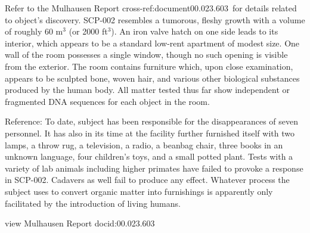  Refer to the Mulhausen Report \lb cross-ref:\linebreak document00.023.603\rb \ for details related to object's discovery. SCP-002 resembles a tumorous, fleshy growth with a volume of roughly 60 m$^3$ (or 2000 ft$^3$). An iron valve hatch on one side leads to its interior, which appears to be a standard low-rent apartment of modest size. One wall of the room possesses a single window, though no such opening is visible from the exterior. The room contains furniture which, upon close examination, appears to be sculpted bone, woven hair, and various other biological substances produced by the human body. All matter tested thus far show independent or fragmented DNA sequences for each object in the room.

Reference: To date, subject has been responsible for the disappearances of seven personnel. It has also in its time at the facility further furnished itself with two lamps, a throw rug, a television, a radio, a beanbag chair, three books in an unknown language, four children's toys, and a small potted plant. Tests with a variety of lab animals including higher primates have failed to provoke a response in SCP-002. Cadavers as well fail to produce any effect. Whatever process the subject uses to convert organic matter into furnishings is apparently only facilitated by the introduction of living humans.

\begin{boxedminipage}{\textwidth}
view Mulhausen Report docid:00.023.603
\end{boxedminipage}

